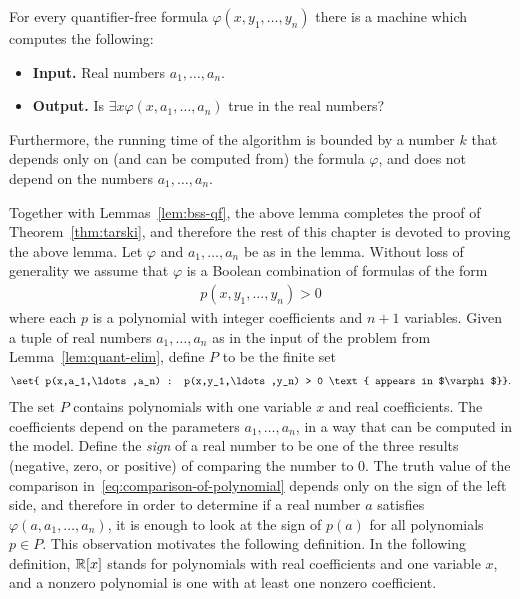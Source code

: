 \begin{lemma}\label{lem:quant-elim} For every quantifier-free formula $\varphi(x,y_1,\ldots,y_n)$ there is  a \bss machine which computes the following:
\begin{itemize}
	\item {\bf Input.} Real numbers $a_1,\ldots,a_n$.
	\item {\bf Output.} Is $ \exists x \varphi(x,a_1,\ldots,a_n)$ true in the real numbers?
\end{itemize}
Furthermore, the running time of the algorithm is bounded by a number $k$ that depends only on (and can be computed from) the formula $\varphi$, and does not depend on the numbers $a_1,\ldots,a_n$.
\end{lemma}

Together with  Lemmas~\ref{lem:bss-qf}, the above lemma completes the proof of Theorem~\ref{thm:tarski}, and therefore the rest of this chapter is devoted to proving the above lemma. 
Let $\varphi$ and $a_1,\ldots,a_n$  be as in the lemma. Without loss of generality we assume that $\varphi$ is a Boolean combination of formulas of the form
\begin{align}\label{eq:comparison-of-polynomial}
  p(x,y_1,\ldots,y_n) > 0
\end{align}
where each $p$ is a polynomial with integer coefficients and $n+1$ variables.
Given a tuple of real numbers $a_1,\ldots,a_n$ as in the input of the problem from Lemma~\ref{lem:quant-elim}, define $P$ to be the finite set
\begin{align}\label{eq:polynomials-in-normal-form}
  \set{ p(x,a_1,\ldots,a_n) : p(x,y_1,\ldots,y_n) > 0 \text{ appears in $\varphi$}}.
\end{align}
The set $P$  contains polynomials with one variable $x$ and real coefficients. The coefficients depend  on the parameters $a_1,\ldots,a_n$, in a way that can be computed in the \bss model.     Define the \emph{sign} of a real number to be one of  the three results (negative, zero, or positive) of comparing the number to $0$.  The truth value of the comparison in~\eqref{eq:comparison-of-polynomial} depends only on the sign of the left side, and therefore in order to determine if a real number $a$ satisfies  $\varphi(a,a_1,\ldots,a_n)$, it is enough to look at the sign of $p(a)$ for all   polynomials $p \in P$. This observation motivates the following definition. In the following definition, $\mathbb R[x]$ stands for polynomials with real coefficients and one variable $x$, and  a nonzero polynomial is one with at least one nonzero coefficient.

